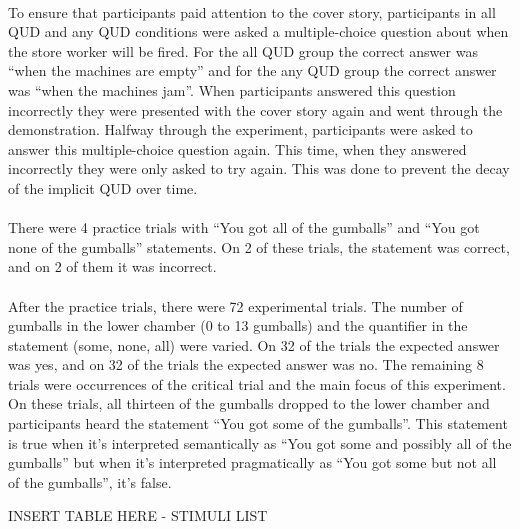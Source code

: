 \documentclass[12pt]{article}
\begin{document}
\paragraph{}To ensure that participants paid attention to the cover story, participants in all QUD and any QUD conditions were asked a multiple-choice question about when the store worker will be fired. For the all QUD group the correct answer was “when the machines are empty” and for the any QUD group the correct answer was “when the machines jam”. When participants answered this question incorrectly they were presented with the cover story again and went through the demonstration. Halfway through the experiment, participants were asked to answer this multiple-choice question again. This time, when they answered incorrectly they were only asked to try again. This was done to prevent the decay of the implicit QUD over time. 

\paragraph{}There were 4 practice trials with “You got all of the gumballs” and “You got none of the gumballs” statements. On 2 of these trials, the statement was correct, and on 2 of them it was incorrect. 

\paragraph{}After the practice trials, there were 72 experimental trials. The number of gumballs in the lower chamber (0 to 13 gumballs) and the quantifier in the statement (some, none, all) were varied.  On 32 of the trials the expected answer was yes, and on 32 of the trials the expected answer was no. The remaining 8 trials were occurrences of the critical trial and the main focus of this experiment. On these trials, all thirteen of the gumballs dropped to the lower chamber and participants heard the statement “You got some of the gumballs”. This statement is true when it’s interpreted semantically as “You got some and possibly all of the gumballs” but when it’s interpreted pragmatically as “You got some but not all of the gumballs”, it’s false.

\begin{center}INSERT TABLE HERE - STIMULI LIST\end{center}
\end{document}

